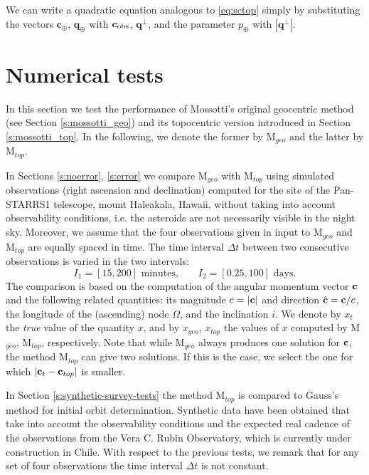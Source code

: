 \documentclass[11pt]{article}
\def\angmom{\bm{c}}
\def\bq{\bm{q}}
\def\angmom{{\bm{c}}}
\def\obs{{\rm obs}}
\def\bqperp{\bm{q}^\perp}
\def\obs{{\rm obs}}
\begin{document}
We can write a quadratic equation analogous to \eqref{eq:sctop} simply by substituting the vectors $\angmom_\oplus$, $\bq_\oplus$ with $\angmom_\obs$, $\bqperp$, and the parameter $p_\oplus$ with $|\bqperp|$.



\section{Numerical tests}
\label{s:numtests}

In this section we test the performance of Mossotti's original geocentric method (see Section \ref{s:mossotti_geo}) and its topocentric version introduced in Section \ref{s:mossotti_top}. 
In the following, we denote the former by M$_{geo}$ and the latter by M$_{top}$.

In Sections \ref{s:noerror}, \ref{s:error} we compare M$_{geo}$ with M$_{top}$ using simulated observations (right ascension and declination) computed for the site of the Pan-STARRS1 telescope, mount Haleakala, Hawaii, without taking into account observability conditions, i.e. the asteroids are not necessarily visible in the night sky. 
Moreover, we assume that the four observations given in input to M$_{geo}$ and M$_{top}$ are equally spaced in time. 
The time interval $\Delta t$ between two consecutive observations is varied in the two intervals:
\begin{equation}
    I_1=[15,200]\text{ minutes,}\qquad I_2=[0.25,100]\text{ days.}
    \label{I12}
\end{equation}
The comparison is based on the computation of the angular momentum vector ${\bf c}$ and the following related quantities: its magnitude $c = |{\bf c}|$ and direction $\hat{{\bf c}}={\bf c}/c$, the longitude of the (ascending) node $\Omega$, and the inclination $i$. 
We denote by $x_t$ the \emph{true} value of the quantity $x$, and by $x_{geo}$, $x_{top}$ the values of $x$ computed by M$_{geo}$, M$_{top}$, respectively. 
Note that while M$_{geo}$ always produces one solution for ${\bf c}$, the method M$_{top}$ can give two solutions. 
If this is the case, we select the one for which $|{\bf c}_t-{\bf c}_{top}|$ is smaller.

In Section \ref{s:synthetic-survey-tests} the method M$_{top}$ is compared to Gauss's method for initial orbit determination.
Synthetic data have been obtained that take into account the observability conditions and the expected real cadence of the observations from the Vera C. Rubin Observatory, which is currently under construction in Chile. 
With respect to the previous tests, we remark that for any set of four observations the time interval $\Delta t$ is not constant.
\end{document}
